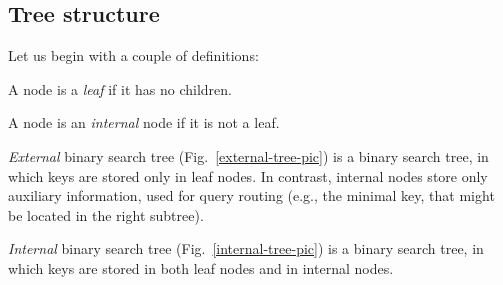 \documentclass[times, dvipsnames,%
               languages={russian,english} %
              ]{itmo-student-thesis}
\begin{document}
\subsection{Tree structure}

Let us begin with a couple of definitions:

\bigbreak

\begin{definition}
A node is a \emph{leaf} if it has no children.
\end{definition}

\begin{definition}
A node is an \emph{internal} node if it is not a leaf.
\end{definition}

\begin{definition}
\emph{External} binary search tree (Fig.~\ref{external-tree-pic}) is a binary search tree, in which keys are stored only in leaf nodes. In contrast, internal nodes store only auxiliary information, used for query routing (e.g., the minimal key, that might be located in the right subtree).
\end{definition}

\begin{definition}
\emph{Internal} binary search tree (Fig.~\ref{internal-tree-pic}) is a binary search tree, in which keys are stored in both leaf nodes and in internal nodes.
\end{definition}
\end{document}
